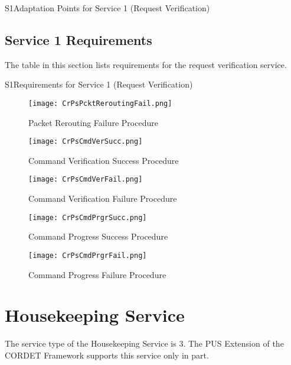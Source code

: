 \documentclass{pnp_article}
\begin{document}
\begin{crAp}{S1}{Adaptation Points for Service 1 (Request Verification)}
\end{crAp}


\newpage
\subsection{Service 1 Requirements}
The table in this section lists requirements for the request verification service.

\begin{crReq}{S1}{Requirements for Service 1 (Request Verification)}
\end{crReq}


\newpage
\begin{figure}[H]
 \centering
 \texttt{[image: CrPsPcktReroutingFail.png]}
 \caption{Packet Rerouting Failure Procedure}
 \label{fig:PcktReroutingFail}
\end{figure}

\begin{figure}[htbp]
 \centering
 \texttt{[image: CrPsCmdVerSucc.png]}
 \caption{Command Verification Success Procedure}
 \label{fig:CmdVerSucc}
\end{figure}

\begin{figure}[htbp]
 \centering
 \texttt{[image: CrPsCmdVerFail.png]}
 \caption{Command Verification Failure Procedure}
 \label{fig:CmdVerFail}
\end{figure}

\begin{figure}[htbp]
 \centering
 \texttt{[image: CrPsCmdPrgrSucc.png]}
 \caption{Command Progress Success Procedure}
 \label{fig:CmdPrgrSucc}
\end{figure}

\begin{figure}[H]
 \centering
 \texttt{[image: CrPsCmdPrgrFail.png]}
 \caption{Command Progress Failure Procedure}
 \label{fig:CmdPrgrFail}
\end{figure}

\section{Housekeeping Service}\label{sec:serv3}
The service type of the Housekeeping Service is 3. The PUS Extension of the CORDET Framework supports this service only in part.
\end{document}
